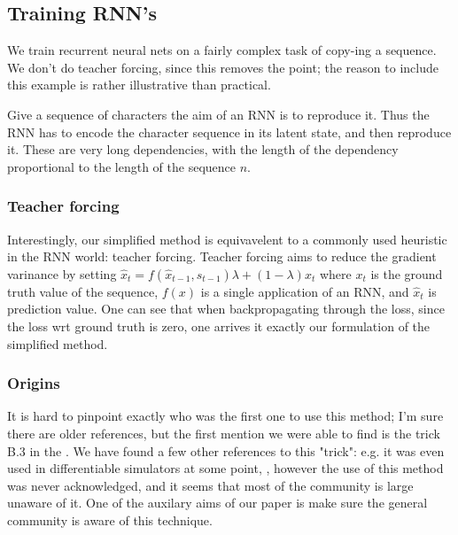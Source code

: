\documentclass{article}
\begin{document}

\subsection{Training RNN's}

We train recurrent neural nets on a fairly complex task of copy-ing a sequence. We don't do teacher forcing, since this removes the point; the reason to include this example is rather illustrative than practical. 

Give a sequence of characters the aim of an RNN is to reproduce it. Thus the RNN has to encode the character sequence in its latent state, and then reproduce it. These are very long dependencies, with the length of the dependency proportional to the length of the sequence $n$.

\subsubsection{Teacher forcing}

Interestingly, our simplified method is equivavelent to a commonly used heuristic in the RNN world: teacher forcing. Teacher forcing aims to reduce the gradient varinance by setting $\hat{x}_t = f(\hat{x}_{t-1}, s_{t-1})\lambda+(1-\lambda)x_t$ where $x_t$ is the ground truth value of the sequence, $f(x)$ is a single application of an RNN, and $\hat{x}_t$ is prediction value. One can see that when backpropagating through the loss, since the loss wrt ground truth is zero, one arrives it exactly our formulation of the simplified method.

\subsubsection{Origins}

It is hard to pinpoint exactly who was the first one to use this method; I'm sure there are older references, but the first mention we were able to find is the trick B.3 in the \citet{some old protein optimization paper}. We have found a few other references to this "trick": e.g. it was even used in differentiable simulators at some point, \citet{paper by scaramuzza with some robots and using this trick to stabilize gradients}, however the use of this method was never acknowledged, and it seems that most of the community is large unaware of it. One of the auxilary aims of our paper is make sure the general community is aware of this technique.
\end{document}
